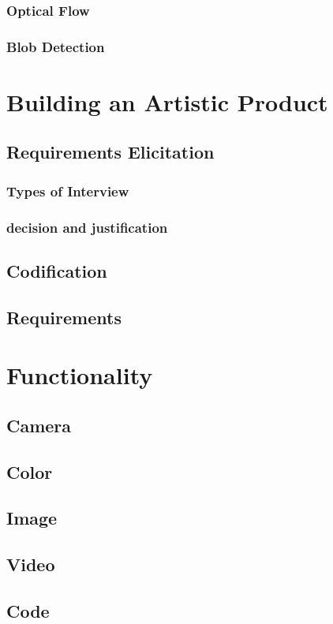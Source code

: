 \documentclass[a4paper]{report}
\begin{document}
\subsubsection{Optical Flow}
\subsubsection{Blob Detection}

\section{Building an Artistic Product}
\subsection{Requirements Elicitation}
\subsubsection{Types of Interview}
\subsubsection{decision and justification}
\subsection{Codification}
\subsection{Requirements}

\section{Functionality}
\subsection{Camera}
\subsection{Color}
\subsection{Image}
\subsection{Video}
\subsection{Code}
\end{document}
